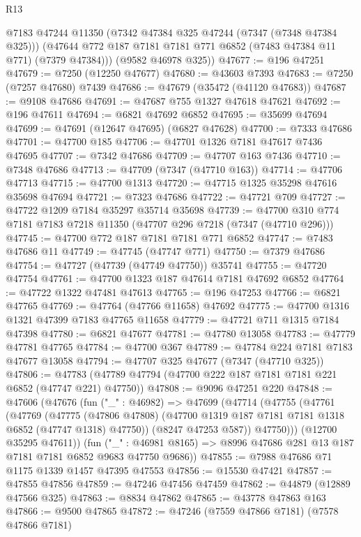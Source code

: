 \begin{lexlean}{R13}
\begin{coremodule}
        @7183
        @47244
        @11350
        (@7342 @47384 @325 @47244 (@7347 (@7348 @47384 @325)))
        (@47644 @772 @187 @7181 @7181 @771 @6852 (@7483 @47384 @11 @771) (@7379 @47384)))
      (@9582 @46978 @325))
@47677 := @196 @47251
@47679 := @7250 (@12250 @47677)
@47680 := @43603 @7393
@47683 := @7250 (@7257 @47680) @7439
@47686 := @47679 (@35472 (@41120 @47683))
@47687 := @9108 @47686
@47691 := @47687 @755 @1327 @47618 @47621
@47692 := @196 @47611
@47694 := @6821 @47692 @6852
@47695 := @35699 @47694
@47699 := @47691 (@12647 @47695) (@6827 @47628)
@47700 := @7333 @47686
@47701 := @47700 @185
@47706 := @47701 @1326 @7181 @47617 @7436 @47695
@47707 := @7342 @47686
@47709 := @47707 @163 @7436
@47710 := @7348 @47686
@47713 := @47709 (@7347 (@47710 @163))
@47714 := @47706 @47713
@47715 := @47700 @1313
@47720 := @47715 @1325 @35298 @47616 @35698 @47694
@47721 := @7323 @47686
@47722 := @47721 @709
@47727 := @47722 @1209 @7184 @35297 @35714 @35698
@47739 := @47700 @310 @774 @7181 @7183 @7218 @11350 (@47707 @296 @7218 (@7347 (@47710 @296)))
@47745 := @47700 @772 @187 @7181 @7181 @771 @6852
@47747 := @7483 @47686 @11
@47749 := @47745 (@47747 @771)
@47750 := @7379 @47686
@47754 := @47727 (@47739 (@47749 @47750)) @35741
@47755 := @47720 @47754
@47761 := @47700 @1323 @187 @47614 @7181 @47692 @6852
@47764 := @47722 @1322 @47481 @47613
@47765 := @196 @47253
@47766 := @6821 @47765
@47769 := @47764 (@47766 @11658) @47692
@47775 := @47700 @1316 @1321 @47399 @7183 @47765 @11658
@47779 := @47721 @711 @1315 @7184 @47398
@47780 := @6821 @47677
@47781 := @47780 @13058
@47783 := @47779 @47781 @47765
@47784 := @47700 @367
@47789 := @47784 @224 @7181 @7183 @47677 @13058
@47794 := @47707 @325 @47677 (@7347 (@47710 @325))
@47806 := @47783 (@47789 @47794 (@47700 @222 @187 @7181 @7181 @221 @6852 (@47747 @221) @47750))
@47808 := @9096 @47251 @220
@47848 := @47606
    (@47676
      (fun ("_" : @46982) =>
      @47699
        (@47714
          (@47755
            (@47761
              (@47769
                (@47775
                  (@47806 @47808)
                  (@47700 @1319 @187 @7181 @7181 @1318 @6852 (@47747 @1318) @47750))
                (@8247 @47253 @587))
              @47750)))
        (@12700 @35295 @47611))
      (fun ("_" : @46981 @8165) => @8996 @47686 @281 @13 @187 @7181 @7181 @6852 @9683 @47750 @9686))
@47855 := @7988 @47686 @71 @1175 @1339 @1457 @47395 @47553
@47856 := @15530 @47421
@47857 := @47855 @47856
@47859 := @47246 @47456 @47459
@47862 := @44879 (@12889 @47566 @325)
@47863 := @8834 @47862
@47865 := @43778 @47863 @163
@47866 := @9500 @47865
@47872 := @47246 (@7559 @47866 @7181) (@7578 @47866 @7181)

\end{coremodule}
\end{lexlean}
